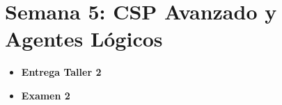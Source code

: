 \chapter{Semana 5: CSP Avanzado y Agentes Lógicos}

\begin{remark}
\begin{itemize}
    \item \textbf{Entrega Taller 2}
    \item \textbf{Examen 2}
\end{itemize}
\end{remark}



